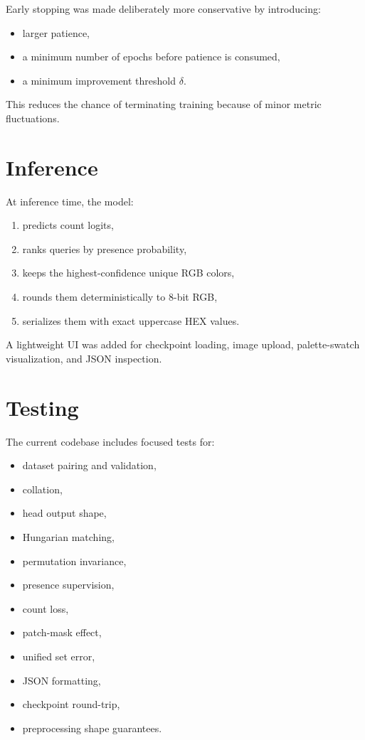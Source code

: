 \documentclass[11pt,a4paper]{article}
\begin{document}
Early stopping was made deliberately more conservative by introducing:
\begin{itemize}[leftmargin=2em]
    \item larger patience,
    \item a minimum number of epochs before patience is consumed,
    \item a minimum improvement threshold $\delta$.
\end{itemize}

This reduces the chance of terminating training because of minor metric fluctuations.

\section{Inference}

At inference time, the model:
\begin{enumerate}[leftmargin=2em]
    \item predicts count logits,
    \item ranks queries by presence probability,
    \item keeps the highest-confidence unique RGB colors,
    \item rounds them deterministically to 8-bit RGB,
    \item serializes them with exact uppercase HEX values.
\end{enumerate}

A lightweight UI was added for checkpoint loading, image upload, palette-swatch visualization, and JSON inspection.

\section{Testing}

The current codebase includes focused tests for:
\begin{itemize}[leftmargin=2em]
    \item dataset pairing and validation,
    \item collation,
    \item head output shape,
    \item Hungarian matching,
    \item permutation invariance,
    \item presence supervision,
    \item count loss,
    \item patch-mask effect,
    \item unified set error,
    \item JSON formatting,
    \item checkpoint round-trip,
    \item preprocessing shape guarantees.
\end{itemize}
\end{document}

